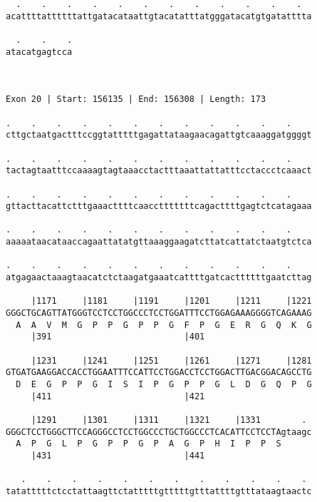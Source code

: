 \documentclass{article}
\begin{document}
\begin{Verbatim}
  .    .    .    .    .    .    .    .    .    .    .    .  
acattttattttttattgatacataattgtacatatttatgggatacatgtgatatttta
                                                            
  .    .    .
atacatgagtcca
             
             
 
Exon 20 | Start: 156135 | End: 156308 | Length: 173
 
.    .    .    .    .    .    .    .    .    .    .    .    
cttgctaatgactttccggtatttttgagattataagaacagattgtcaaaggatggggt
                                                            
.    .    .    .    .    .    .    .    .    .    .    .    
tactagtaatttccaaaagtagtaaacctactttaaattattatttcctaccctcaaact
                                                            
.    .    .    .    .    .    .    .    .    .    .    .    
gttacttacattctttgaaacttttcaacctttttttcagacttttgagtctcatagaaa
                                                            
.    .    .    .    .    .    .    .    .    .    .    .    
aaaaataacataaccagaattatatgttaaaggaagatcttatcattatctaatgtctca
                                                            
.    .    .    .    .    .    .    .    .    .    .    .    
atgagaactaaagtaacatctctaagatgaaatcattttgatcacttttttgaatcttag
                                                            
     |1171     |1181     |1191     |1201     |1211     |1221
GGGCTGCAGTTATGGGTCCTCCTGGCCCTCCTGGATTTCCTGGAGAAAGGGGTCAGAAAG
  A  A  V  M  G  P  P  G  P  P  G  F  P  G  E  R  G  Q  K  G
     |391                          |401                     
  
     |1231     |1241     |1251     |1261     |1271     |1281
GTGATGAAGGACCACCTGGAATTTCCATTCCTGGACCTCCTGGACTTGACGGACAGCCTG
  D  E  G  P  P  G  I  S  I  P  G  P  P  G  L  D  G  Q  P  G
     |411                          |421                     
  
     |1291     |1301     |1311     |1321     |1331        . 
GGGCTCCTGGGCTTCCAGGGCCTCCTGGCCCTGCTGGCCCTCACATTCCTCCTAgtaagc
  A  P  G  L  P  G  P  P  G  P  A  G  P  H  I  P  P  S      
     |431                          |441                     
  
   .    .    .    .    .    .    .    .    .    .    .    . 
tatatttttctcctattaagttctatttttgtttttgtttattttgtttataagtaactc
                                                            

\end{Verbatim}
\end{document}
